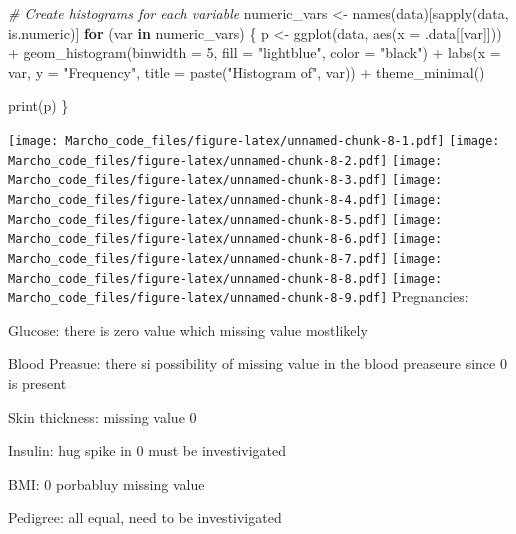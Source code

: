 \documentclass[
]{article}
\newenvironment{Shaded}{\begin{snugshade}}{\end{snugshade}}
\newcommand{\AttributeTok}[1]{\textcolor[rgb]{0.77,0.63,0.00}{#1}}
\newcommand{\CommentTok}[1]{\textcolor[rgb]{0.56,0.35,0.01}{\textit{#1}}}
\newcommand{\ControlFlowTok}[1]{\textcolor[rgb]{0.13,0.29,0.53}{\textbf{#1}}}
\newcommand{\DecValTok}[1]{\textcolor[rgb]{0.00,0.00,0.81}{#1}}
\newcommand{\FunctionTok}[1]{\textcolor[rgb]{0.00,0.00,0.00}{#1}}
\newcommand{\NormalTok}[1]{#1}
\newcommand{\OtherTok}[1]{\textcolor[rgb]{0.56,0.35,0.01}{#1}}
\newcommand{\SpecialCharTok}[1]{\textcolor[rgb]{0.00,0.00,0.00}{#1}}
\newcommand{\StringTok}[1]{\textcolor[rgb]{0.31,0.60,0.02}{#1}}
\begin{document}
\begin{Shaded}
\begin{Highlighting}[]
\CommentTok{\# Create histograms for each variable}
\NormalTok{numeric\_vars }\OtherTok{\textless{}{-}} \FunctionTok{names}\NormalTok{(data)[}\FunctionTok{sapply}\NormalTok{(data, is.numeric)]}
\ControlFlowTok{for}\NormalTok{ (var }\ControlFlowTok{in}\NormalTok{ numeric\_vars) \{}
\NormalTok{  p }\OtherTok{\textless{}{-}} \FunctionTok{ggplot}\NormalTok{(data, }\FunctionTok{aes}\NormalTok{(}\AttributeTok{x =}\NormalTok{ .data[[var]])) }\SpecialCharTok{+}
    \FunctionTok{geom\_histogram}\NormalTok{(}\AttributeTok{binwidth =} \DecValTok{5}\NormalTok{, }\AttributeTok{fill =} \StringTok{"lightblue"}\NormalTok{, }\AttributeTok{color =} \StringTok{"black"}\NormalTok{) }\SpecialCharTok{+}
    \FunctionTok{labs}\NormalTok{(}\AttributeTok{x =}\NormalTok{ var, }\AttributeTok{y =} \StringTok{"Frequency"}\NormalTok{, }\AttributeTok{title =} \FunctionTok{paste}\NormalTok{(}\StringTok{"Histogram of"}\NormalTok{, var)) }\SpecialCharTok{+}
    \FunctionTok{theme\_minimal}\NormalTok{()}
  
  \FunctionTok{print}\NormalTok{(p)}
\NormalTok{\}}
\end{Highlighting}
\end{Shaded}

\texttt{[image: Marcho\_code\_files/figure-latex/unnamed-chunk-8-1.pdf]}
\texttt{[image: Marcho\_code\_files/figure-latex/unnamed-chunk-8-2.pdf]}
\texttt{[image: Marcho\_code\_files/figure-latex/unnamed-chunk-8-3.pdf]}
\texttt{[image: Marcho\_code\_files/figure-latex/unnamed-chunk-8-4.pdf]}
\texttt{[image: Marcho\_code\_files/figure-latex/unnamed-chunk-8-5.pdf]}
\texttt{[image: Marcho\_code\_files/figure-latex/unnamed-chunk-8-6.pdf]}
\texttt{[image: Marcho\_code\_files/figure-latex/unnamed-chunk-8-7.pdf]}
\texttt{[image: Marcho\_code\_files/figure-latex/unnamed-chunk-8-8.pdf]}
\texttt{[image: Marcho\_code\_files/figure-latex/unnamed-chunk-8-9.pdf]}
Pregnancies:

Glucose: there is zero value which missing value mostlikely

Blood Preasue: there si possibility of missing value in the blood
preaseure since 0 is present

Skin thickness: missing value 0

Insulin: hug spike in 0 must be investivigated

BMI: 0 porbabluy missing value

Pedigree: all equal, need to be investivigated
\end{document}
